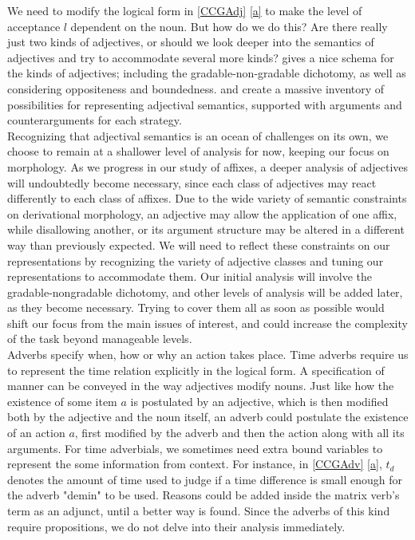 \documentclass[11pt]{article} %
\begin{document}
We need to modify the logical form in \ref{CCGAdj} \ref{a} to make the level of acceptance $l$ dependent on the noun. But how do we do this? Are there really just two kinds of adjectives, or should we look deeper into the semantics of adjectives and try to accommodate several more kinds? \citet{Paradis2001} gives a nice schema for the kinds of adjectives; including the gradable-non-gradable dichotomy, as well as considering oppositeness and boundedness. \citet{KennedyMcNally2005} and \citet{Kennedy2007} create a massive inventory of possibilities for representing adjectival semantics, supported with arguments and counterarguments for each strategy. \\

Recognizing that adjectival semantics is an ocean of challenges on its own, we choose to remain at a shallower level of analysis for now, keeping our focus on morphology. As we progress in our study of affixes, a deeper analysis of adjectives will undoubtedly become necessary, since each class of adjectives may react differently to each class of affixes. Due to the wide variety of semantic constraints on derivational morphology, an adjective may allow the application of one affix, while disallowing another, or its argument structure may be altered in a different way than previously expected. We will need to reflect these constraints on our representations by recognizing the variety of adjective classes and tuning our representations to accommodate them. Our initial analysis will involve the gradable-nongradable dichotomy, and other levels of analysis will be added later, as they become necessary. Trying to cover them all as soon as possible would shift our focus from the main issues of interest, and could increase the complexity of the task beyond manageable levels. \\

Adverbs specify when, how or why an action takes place. Time adverbs require us to represent the time relation explicitly in the logical form. A specification of manner can be conveyed in the way adjectives modify nouns. Just like how the existence of some item $a$ is postulated by an adjective, which is then modified both by the adjective and the noun itself, an adverb could postulate the existence of an action $a$, first modified by the adverb and then the action along with all its arguments. For time adverbials, we sometimes need extra bound variables to represent the some information from context. For instance, in \ref{CCGAdv} \ref{a}, $t_d$ denotes the amount of time used to judge if a time difference is small enough for the adverb "demin" to be used. Reasons could be added inside the matrix verb's term as an adjunct, until a better way is found. Since the adverbs of this kind require propositions, we do not delve into their analysis immediately. 
\end{document}
